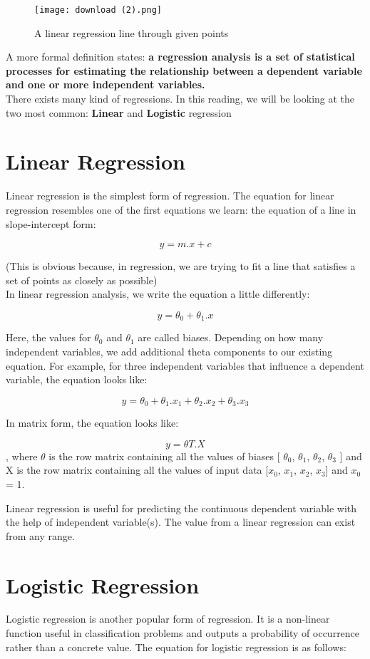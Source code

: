 \documentclass{article}
\begin{document}
\begin{figure}[h]
\texttt{[image: download (2).png]}
\centering
\caption{A linear regression line through given points}
\end{figure}

A more formal definition states: {\textbf{a regression analysis is a set of statistical processes for estimating the relationship between a dependent variable and one or more independent variables.
}}\\

There exists many kind of regressions. In this reading, we will be looking at the two most common: \textbf{Linear} and \textbf{Logistic} regression

\section{Linear Regression}
Linear regression is the simplest form of regression. The equation for linear regression resembles one of the first equations we learn: the equation of a line in slope-intercept form:

\[ y = m.x + c \]

(This is obvious because, in regression, we are trying to fit a line that satisfies a set of points as closely as possible)\\ 
In linear regression analysis, we write the equation a little differently:

\[ y = \theta_0 + \theta_1.x \]

Here, the values for $\theta_0$ and $\theta_1$ are called biases. Depending on how many independent variables, we add additional theta components to our existing equation. For example, for three independent variables that influence a dependent variable, the equation looks like:

\[ y = \theta_0 + \theta_1.x_1 + \theta_2.x_2 + \theta_3.x_3 \]

In matrix form, the equation looks like:

\[ y = \theta T.X \]
, where $\theta$ is the row matrix containing all the values of biases [ $\theta_0$, $\theta_1$, $\theta_2$, $\theta_3$ ] and X is the row matrix containing all the values of input data [$x_0$, $x_1$, $x_2$, $x_3$] and $x_0$ = 1.

Linear regression is useful for predicting the continuous dependent variable with the help of independent variable(s). The value from a linear regression can exist from any range.

\newpage
\section{Logistic Regression}
Logistic regression is another popular form of regression. It is a non-linear function useful in classification problems and outputs a probability of occurrence rather than a concrete value. The equation for logistic regression is as follows:
\end{document}

